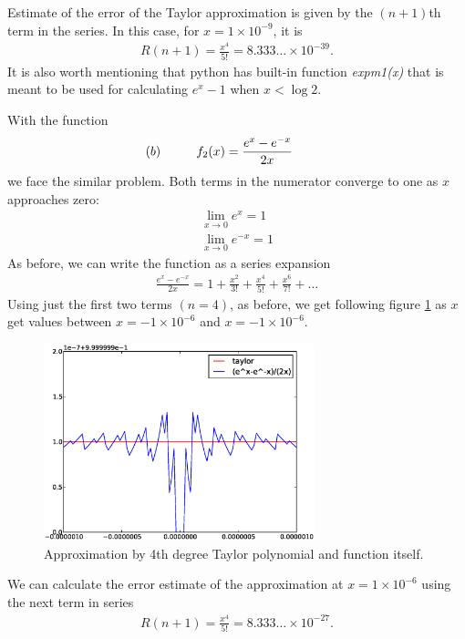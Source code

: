 \documentclass[a4paper,12pt]{scrartcl}
\begin{document}
Estimate of the error of the Taylor approximation is given by the $(n+1)$th term in the series. In this case, for $x=1\times10^{-9}$, it is
\begin{align*}
R(n+1)=\frac{x^4}{5!}=8.333\ldots\times10^{-39}.
\end{align*}
It is also worth mentioning that python has built-in function \emph{expm1(x)} that is meant to be used for calculating $e^x-1$ when $x<\log 2$.

With the function
\begin{align*}
\hspace{-10mm}(b)\hspace{10mm}f_2(x)=\frac{e^x - e^{-x}}{2x}
\end{align*}
we face the similar problem. Both terms in the numerator converge to one as $x$ approaches zero:
\begin{align*}
\lim_{x\to0}e^x=1\\
\lim_{x\to0}e^{-x}=1
\end{align*}
As before, we can write the function as a series expansion
\begin{align*}
\frac{e^x - e^{-x}}{2x}=1 + \frac{x^2}{3!} + \frac{x^4}{5!} + \frac{x^6}{7!} + \ldots
\end{align*}
Using just the first two terms $(n=4)$, as before, we get following figure \ref{fig:taylor2} as $x$ get values between $x=-1\times10^{-6}$ and $x=-1\times10^{-6}$.
\begin{figure}[h!]
  \centering
    \includegraphics[width=0.7\textwidth]{taylor2}
  \caption{Approximation by 4th degree Taylor polynomial and function itself.}
  \label{fig:taylor2}
\end{figure}

We can calculate the error estimate of the approximation at $x=1\times10^{-6}$ using the next term in series
\begin{align*}
R(n+1)=\frac{x^4}{5!}=8.333\ldots\times10^{-27}.
\end{align*}
\end{document}
